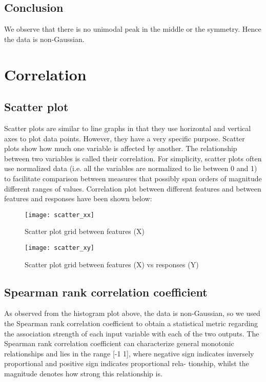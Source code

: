 \subsection{Conclusion}
We observe that there is no unimodal peak in the middle or the symmetry. Hence the data is non-Gaussian.

\section{Correlation}
  \subsection{Scatter plot}
    Scatter plots are similar to line graphs in that they use horizontal and vertical axes to plot data points. However, they have a very specific purpose. Scatter plots show how much one variable is affected by another. The relationship between two variables is called their correlation. For simplicity, scatter plots often use normalized data (i.e. all the variables are normalized to lie between 0 and 1) to facilitate comparison between measures that possibly span orders of magnitude different ranges of values.
Correlation plot between different features and between features and responses have been shown below:    
    \begin{figure}
      \centering
      \texttt{[image: scatter\_xx]}
      \caption{Scatter plot grid between features (X)}
      \label{fig:scatter_xx}
    \end{figure}
    \begin{figure}
      \centering
      \texttt{[image: scatter\_xy]}
      \caption{Scatter plot grid between features (X) vs responses (Y)}
      \label{fig:scatter_xy}
    \end{figure}

  \subsection{Spearman rank correlation coefficient}
    As observed from the histogram plot above, the data is non-Gaussian, so we used the Spearman rank correlation coefficient to obtain a statistical metric regarding the association strength of each input variable with each of the two outputs. The Spearman rank correlation coefficient can characterize general monotonic relationships and lies in the range [-1 1], where negative sign indicates inversely proportional and positive sign indicates proportional rela- tionship, whilst the magnitude denotes how strong this relationship is.
    
